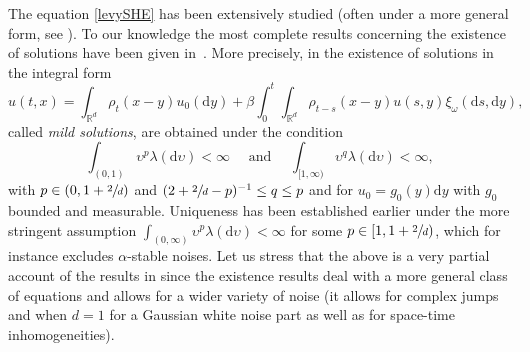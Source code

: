 \documentclass[10pt]{amsart}
\theoremstyle{definition}
\newcommand{\dd}{\mathrm{d}}
\newcommand{\bbR}{{\ensuremath{\mathbb R}} }
\let\ga\alpha
\let\gl\lambda
\let\ups\upsilon
\let\go\omega
\begin{document}
The equation \eqref{levySHE} has been extensively studied (often under a more general form, see \eg \cite{Mueller98, Loubert98}). To our knowledge the most complete results concerning the existence of solutions have been given in~\cite{Chong17}.
More precisely, in \cite{Chong17} the existence of solutions in the integral form
\begin{equation}\label{integralz}
u(t,x)= \int_{\bbR^d} \rho_{t}(x-y) u_0(\dd y) +\beta \int^t_0\int_{\bbR^d} \rho_{t-s}(x-y) u(s,y)
\xi_{\go}(\dd s, \dd y),
\end{equation}
called \textit{mild solutions},
are obtained under the condition
\begin{equation}\label{hypochong}
\int_{(0,1)} \ups^p \gl(\dd\ups)<\infty \quad \text{ and } \quad \int_{[1,\infty)} \ups^q \gl(\dd\ups)<\infty,
\end{equation}
with $p\in (0,1+\sfrac2d)$ and $ (2+\sfrac{2}{d}-p)^{-1} \le q\le p$ and for $u_0=g_0(y) \dd y$ with $g_0$ bounded and measurable.
Uniqueness has been established earlier \cite{Loubert98} under the more stringent assumption
$\int_{(0,\infty)} \ups^p \gl(\dd\ups)<\infty$ for some $p\in [1,1+\sfrac2d)$, which for instance excludes $\ga$-stable noises.
Let us stress that the above is a very partial account of the results in \cite{Chong17} since the existence results deal with a more general class of equations and allows for a wider variety of noise (it allows for complex jumps and when $d=1$ for a Gaussian white noise part as well as for space-time inhomogeneities).
\end{document}
